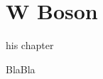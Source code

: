 \let\textcircled=\pgftextcircled
\chapter{W Boson} \label{sec:WBoson}

his chapter

BlaBla









\clearpage
